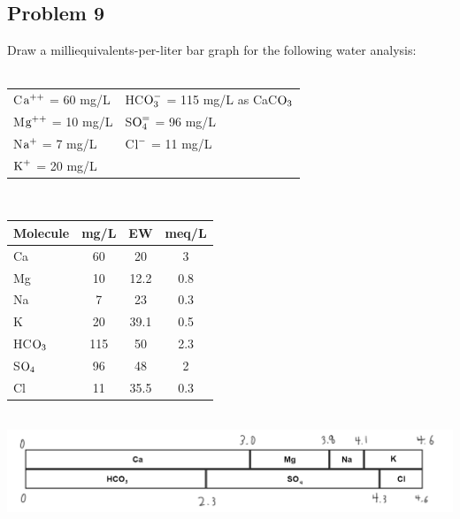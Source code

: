 \subsection*{Problem 9}
Draw a milliequivalents-per-liter bar graph for the following water analysis:\\\\
\begin{tabular}{l l}
    C\(\textnormal{a}^{++}\) = 60 mg/L & HC\(\textnormal{O}_{3}^-\) = 115 mg/L as CaC\(\textnormal{O}_3\) \\
    M\(\textnormal{g}^{++}\) = 10 mg/L & S\(\textnormal{O}_{4}^{=}\) = 96 mg/L \\
    N\(\textnormal{a}^{+}\) = 7 mg/L  &  C\(\textnormal{l}^{-}\) = 11 mg/L \\
    \(\textnormal{K}^{+}\) = 20 mg/L &
\end{tabular}
\\
\begin{center}
\begin{tabular}{l c c c}
    Molecule & mg/L & EW & meq/L\\
    \hline
    Ca & 60 & 20 & 3\\
    Mg & 10 & 12.2 & 0.8\\
    Na & 7 & 23 & 0.3\\
    K & 20 & 39.1 & 0.5\\
    HC\(\textnormal{O}_3\) & 115 & 50 & 2.3\\
    S\(\textnormal{O}_4\) & 96 & 48 & 2\\
    Cl & 11 & 35.5 & 0.3
\end{tabular}\\
\includegraphics[scale=0.33]{diagram1.png}
\end{center}


